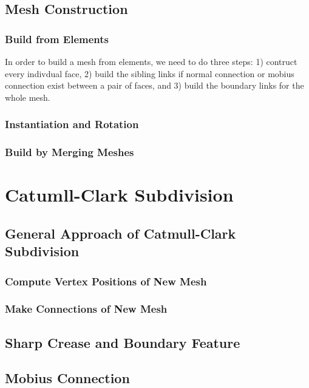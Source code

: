 \documentclass[12pt]{article}
\begin{document}
\subsection{Mesh Construction}

\subsubsection{Build from Elements}
In order to build a mesh from elements, we need to do three steps: 1) contruct every indivdual face, 2) build the sibling links if normal connection or mobius connection exist between a pair of faces, and 3) build the boundary links for the whole mesh.

\subsubsection{Instantiation and Rotation}
\subsubsection{Build by Merging Meshes}

\section{Catumll-Clark Subdivision} \label{sec:ccsd}

\subsection{General Approach of Catmull-Clark Subdivision}

\subsubsection{Compute Vertex Positions of New Mesh}

\subsubsection{Make Connections of New Mesh}

\subsection{Sharp Crease and Boundary Feature}

\subsection{Mobius Connection}
\end{document}
